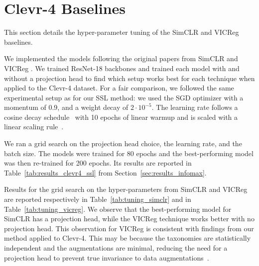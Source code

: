 \section{Clevr-4 Baselines} \label{app:clevr4_baselines}

This section details the hyper-parameter tuning of the SimCLR and VICReg baselines. 

We implemented the models following the original papers from SimCLR \cite{chen2020SimCLR_ssl} and VICReg \cite{bardes2021vicreg_ssl}. 
We trained ResNet-18 backbones and trained each model with and without a projection head to find which setup works best for each technique when applied to the Clevr-4 dataset. 
For a fair comparison, we followed the same experimental setup as for our SSL method: 
we used the SGD optimizer with a momentum of 0.9, and a weight decay of $2 \cdot 10^{-5}$. The learning rate follows a cosine decay schedule~\citep{loshchilov2016sgdr} with 10 epochs of linear warmup and is scaled with a linear scaling rule~\citep{goyal2017lr_scaling_rule}.

We ran a grid search on the projection head choice, the learning rate, and the batch size. The models were trained for 80 epochs and the best-performing model was then re-trained for 200 epochs. Its results are reported in Table~\ref{tab:results_clevr4_ssl} from Section~\ref{sec:results_infomax}.

Results for the grid search on the hyper-parameters from SimCLR and VICReg are reported respectively in Table~\ref{tab:tuning_simclr} and in Table~\ref{tab:tuning_vicreg}. We observe that the best-performing model for SimCLR has a projection head, while the VICReg technique works better with no projection head. 
This observation for VICReg is consistent with findings from our method applied to Clevr-4. This may be because the taxonomies are statistically independent and the augmentations are minimal, reducing the need for a projection head to prevent true invariance to data augmentations~\citep{bordes2022guillotine}.
